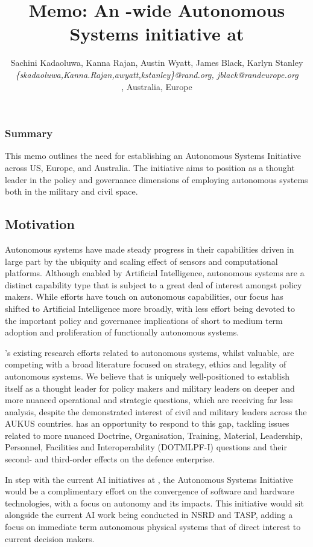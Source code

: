 \documentclass[11pt,letterpaper]{article}
\title{Memo: An \auke-wide Autonomous Systems initiative at \org}
\author{\textsf{\large{Sachini Kadaoluwa, Kanna Rajan, Austin Wyatt,
      James Black, Karlyn Stanley}}\\
  \emph{\{skadaoluwa,Kanna.Rajan,awyatt,kstanley\}@rand.org, jblack@randeurope.org}\\
  \orge, \org Australia, \org Europe
  }
\begin{document}
\maketitle{}

\subsubsection{Summary}

This memo outlines the need for establishing an Autonomous Systems
Initiative across \org US, Europe, and Australia. The initiative aims
to position \org as a thought leader in the policy and governance
dimensions of employing autonomous systems both in the military and
civil space.

\subsection{Motivation}

Autonomous systems have made steady progress in their capabilities
driven in large part by the ubiquity and scaling effect of sensors and
computational platforms. Although enabled by Artificial Intelligence,
autonomous systems are a distinct capability type that is subject to a
great deal of interest amongst policy makers. While \org efforts have
touch on autonomous capabilities, our focus has shifted to Artificial
Intelligence more broadly, with less effort being devoted to the
important policy and governance implications of short to medium term
adoption and proliferation of functionally autonomous systems.

\orge’s existing research efforts related to autonomous systems, whilst
valuable, are competing with a broad literature focused on strategy,
ethics and legality of autonomous systems. We believe that \org is
uniquely well-positioned to establish itself as a thought leader for
policy makers and military leaders on deeper and more nuanced
operational and strategic questions, which are receiving far less
analysis, despite the demonstrated interest of civil and military
leaders across the AUKUS countries.  \org has an opportunity to
respond to this gap, tackling issues related to more nuanced Doctrine,
Organisation, Training, Material, Leadership, Personnel, Facilities
and Interoperability (DOTMLPF-I) questions and their second- and
third-order effects on the defence enterprise.

In step with the current AI initiatives at \orge, the Autonomous
Systems Initiative would be a complimentary effort on the convergence
of software and hardware technologies, with a focus on autonomy and
its impacts. This initiative would sit alongside the current AI work
being conducted in NSRD and TASP, adding a focus on immediate term
autonomous physical systems that of direct interest to current
decision makers.
\end{document}
